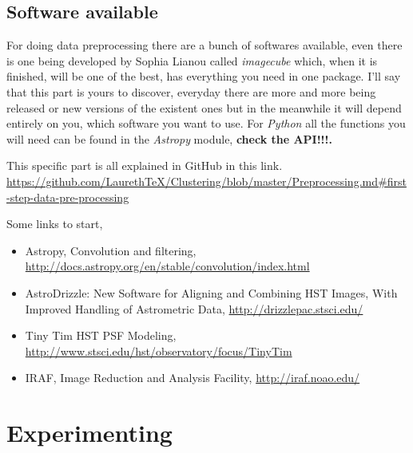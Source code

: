 \documentclass[11pt,fleqn]{book} %
\begin{document}
\section{Software available}
For doing data preprocessing there are a bunch of softwares available, even there is one being developed by Sophia Lianou called \emph{imagecube} which, when it is finished, will be one of the best, has everything you need in one package. I'll say that this part is yours to discover, everyday there are more and more being released or new versions of the existent ones but in the meanwhile it will depend entirely on you, which software you want to use. For \emph{Python} all the functions you will need can be found in the \emph{Astropy} module, \textbf{check the API!!!.}


This specific part is all explained in GitHub in this link. \url{https://github.com/LaurethTeX/Clustering/blob/master/Preprocessing.md#first-step-data-pre-processing}

\begin{remark}
	Some links to start,
    \begin{itemize}
    	\item Astropy, Convolution and filtering, \url{http://docs.astropy.org/en/stable/convolution/index.html}
        \item AstroDrizzle: New Software for Aligning and Combining
HST Images, With Improved Handling of Astrometric Data, \url{http://drizzlepac.stsci.edu/}
		\item Tiny Tim HST PSF Modeling, \url{http://www.stsci.edu/hst/observatory/focus/TinyTim}
        \item IRAF, Image Reduction and Analysis Facility, \url{http://iraf.noao.edu/}
    \end{itemize}
\end{remark}




\chapter{Experimenting}
\end{document}
